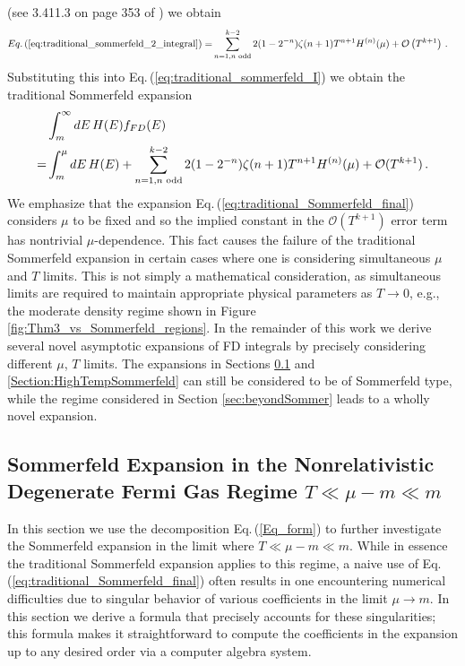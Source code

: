 \documentclass[sn-mathphys,Numbered]{sn-jnl}
\newcommand{\req}[1]{Eq.\,(\ref{#1})}
\begin{document}
(see 3.411.3 on page 353 of \cite{Gradshteyn:1943cpj}) we obtain 
\begin{align}
 \req{eq:traditional_sommerfeld_2_integral} 
 =&\sum_{n=1,n\text{ odd}}^{k-2} 2(1-2^{-n})\zeta(n+1)T^{n+1} H^{(n)}(\mu) +\mathcal{O}\left(T^{k+1}\right)\,.
\end{align}
Substituting this into \req{eq:traditional_sommerfeld_I} we obtain the traditional Sommerfeld expansion
\begin{align}
 &\int_m^\infty dE\, H(E) f_{FD}(E)\notag\\
 = &\int_m^\mu dE\, H(E)+\sum_{n=1,n\text{ odd}}^{k-2} 2(1-2^{-n})\zeta(n+1)T^{n+1} H^{(n)}(\mu) +\mathcal{O}(T^{k+1})\,.\label{eq:traditional_Sommerfeld_final}
 \end{align}
 We emphasize that the expansion \req{eq:traditional_Sommerfeld_final} considers $\mu$ to be fixed and so the implied constant in the $\mathcal{O}(T^{k+1})$ error term has nontrivial $\mu$-dependence. This fact  causes the failure of the traditional Sommerfeld expansion in certain cases where one is considering simultaneous $\mu$ and $T$ limits.  This is not simply a mathematical consideration, as simultaneous limits are required to maintain appropriate physical parameters as $T\to 0$, e.g., the moderate density regime  shown in Figure \ref{fig:Thm3_vs_Sommerfeld_regions}.  In the remainder of this work we derive several novel asymptotic expansions of FD integrals by precisely considering different $\mu$, $T$ limits.  The expansions in Sections \ref{sec:asymp_T_0_faster} and \ref{Section:HighTempSommerfeld}  can still be considered to be of Sommerfeld type, while the regime considered in Section \ref{sec:beyondSommer} leads to a wholly novel expansion.




\subsection{Sommerfeld Expansion in the Nonrelativistic Degenerate Fermi Gas Regime $T\ll \mu-m\ll m$}\label{sec:asymp_T_0_faster}
In this section we use the decomposition \req{Eq_form} to further investigate the Sommerfeld expansion in the limit where $T\ll\mu-m\ll m$. While in essence the traditional Sommerfeld expansion  applies to this regime, a naive use of \req{eq:traditional_Sommerfeld_final} often results in one encountering numerical difficulties due to singular behavior of various coefficients in the limit $\mu\to m$. In this section we derive a formula that precisely accounts for these singularities; this formula makes it straightforward to compute the coefficients in the expansion up to any desired order via a computer algebra system.
\end{document}
